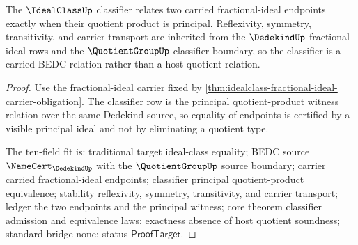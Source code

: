 \begin{theorem}\label{thm:idealclass-principal-classifier-obligation}
The $\IdealClassUp$ classifier relates two carried fractional-ideal endpoints exactly when their quotient product is principal. Reflexivity, symmetry, transitivity, and carrier transport are inherited from the $\DedekindUp$ fractional-ideal rows and the $\QuotientGroupUp$ classifier boundary, so the classifier is a carried BEDC relation rather than a host quotient relation.
\end{theorem}
\begin{proof}
Use the fractional-ideal carrier fixed by \autoref{thm:idealclass-fractional-ideal-carrier-obligation}. The classifier row is the principal quotient-product witness relation over the same Dedekind source, so equality of endpoints is certified by a visible principal ideal and not by eliminating a quotient type.

The ten-field fit is: traditional target ideal-class equality; BEDC source $\NameCert_{\DedekindUp}$ with the $\QuotientGroupUp$ source boundary; carrier carried fractional-ideal endpoints; classifier principal quotient-product equivalence; stability reflexivity, symmetry, transitivity, and carrier transport; ledger the two endpoints and the principal witness; core theorem classifier admission and equivalence laws; exactness absence of host quotient soundness; standard bridge none; status $\mathsf{ProofTarget}$.
\end{proof}

